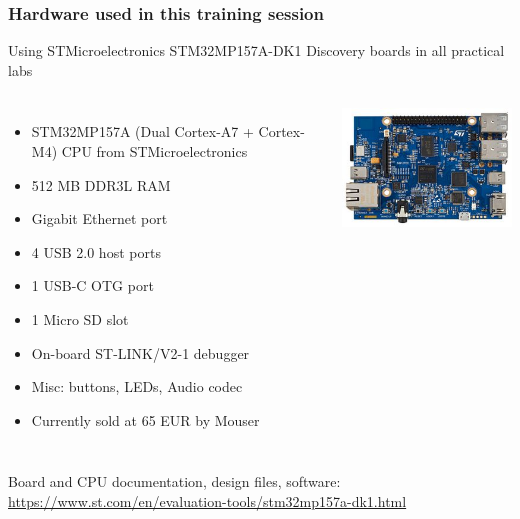 \begin{frame}
\frametitle{Hardware used in this training session}
  Using STMicroelectronics STM32MP157A-DK1 Discovery boards in all practical labs
  \begin{columns}
    {\footnotesize
    \begin{itemize}
    \item STM32MP157A (Dual Cortex-A7 + Cortex-M4) CPU from STMicroelectronics
    \item 512 MB DDR3L RAM
    \item Gigabit Ethernet port
    \item 4 USB 2.0 host ports
    \item 1 USB-C OTG port
    \item 1 Micro SD slot
    \item On-board ST-LINK/V2-1 debugger
    \item Misc: buttons, LEDs, Audio codec
    \item Currently sold at 65 EUR by Mouser
    \end{itemize}
    }
    \includegraphics[width=\textwidth]{slides/discovery-board/discovery-board.jpg}
  \end{columns}
  \vspace{1em}
  {\small
  Board and CPU documentation, design files, software:
  \url{https://www.st.com/en/evaluation-tools/stm32mp157a-dk1.html}
  }
\end{frame}
